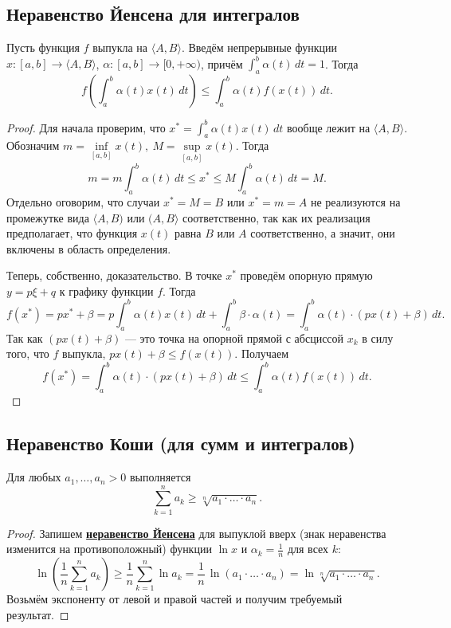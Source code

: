 \subsection{Неравенство Йенсена для интегралов}

\begin{theorem} \hypertarget{Йенсен-интегралы}{}
	Пусть функция \(f\) выпукла на \(\langle A, B \rangle\). Введём непрерывные функции \(x \colon [a, b] \to \langle A, B \rangle\), \(\alpha \colon [a, b] \to [0, +\infty)\), причём \(\int_a^b \alpha(t) \, dt = 1\). Тогда \[
		f \left(\int_a^b \alpha(t) x(t) \, dt \right) \leqslant \int_a^b \alpha(t) f(x(t)) \, dt.
	\]
\end{theorem}
\begin{proof}
	Для начала проверим, что \(x^* = \int_a^b \alpha(t) x(t) \, dt\) вообще лежит на \(\langle A, B \rangle\). Обозначим \(m = \inf\limits_{[a, b]} x(t), \ M = \sup\limits_{[a, b]} x(t)\). Тогда \[
		m = m \int_a^b \alpha(t) \, dt \leqslant x^* \leqslant M \int_a^b \alpha(t) \, dt = M.
	\]
	Отдельно оговорим, что случаи \(x^* = M = B\) или \(x^* = m = A\) не реализуются на промежутке вида  \(\langle A, B)\) или \((A, B \rangle\) соответственно, так как их реализация предполагает, что функция \(x(t)\) равна \(B\) или \(A\) соответственно, а значит, они включены в область определения.
	
	Теперь, собственно, доказательство. В точке \(x^*\) проведём опорную прямую \(y = p \xi + q\) к графику функции \(f\). Тогда \[
		f(x^*) = px^* + \beta = p \int_a^b \alpha(t) x(t) \, dt + \int_a^b \beta \cdot \alpha(t) = \int_a^b \alpha(t) \cdot (p x(t) + \beta) \, dt.
	\]
	Так как \((px(t) + \beta)\) --- это точка на опорной прямой с абсциссой \(x_k\) в силу того, что \(f\) выпукла, \(px(t) + \beta \leqslant f(x(t))\). Получаем \[
		f(x^*) = \int_a^b \alpha(t) \cdot (p x(t) + \beta) \, dt \leqslant \int_a^b \alpha(t) f(x(t)) \, dt.
	\]
\end{proof}

\subsection{Неравенство Коши (для сумм и интегралов)}

\begin{ntheorem}
	Для любых \(a_1, \ldots, a_n > 0\) выполняется \[
		\sum_{k=1}^n a_k \geqslant \sqrt[n]{a_1 \cdot \ldots \cdot a_n}.
	\]
\end{ntheorem}
\begin{proof}
	Запишем \hyperlink{Йенсен-суммы}{\bfseries неравенство Йенсена} для выпуклой вверх (знак неравенства изменится на противоположный) функции \(\ln x\) и \(\alpha_k = \frac{1}{n}\) для всех \(k\): \[
		\ln \left(\frac{1}{n} \sum_{k=1}^n a_k \right) \geqslant \frac{1}{n} \sum_{k=1}^n \ln a_k = \frac{1}{n} \, \ln (a_1 \cdot \ldots \cdot a_n) = \ln \sqrt[n]{a_1 \cdot \ldots \cdot a_n}.
	\]
	Возьмём экспоненту от левой и правой частей и получим требуемый результат.
\end{proof}

